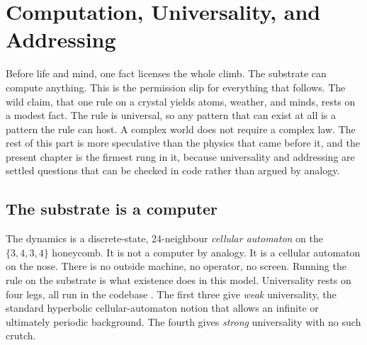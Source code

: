\section{Computation, Universality, and Addressing}

Before life and mind, one fact licenses the whole climb. The substrate can compute anything. This is the permission slip for everything that follows. The wild claim, that one rule on a crystal yields atoms, weather, and minds, rests on a modest fact. The rule is universal, so any pattern that can exist at all is a pattern the rule can host. A complex world does not require a complex law. The rest of this part is more speculative than the physics that came before it, and the present chapter is the firmest rung in it, because universality and addressing are settled questions that can be checked in code rather than argued by analogy.

\subsection{The substrate is a computer}

The dynamics is a discrete-state, 24-neighbour \emph{cellular automaton} on the $\{3,4,3,4\}$ honeycomb. It is not a computer by analogy. It is a cellular automaton on the nose. There is no outside machine, no operator, no screen. Running the rule on the substrate is what existence does in this model. Universality rests on four legs, all run in the codebase \cite{pollard2026vibetest}. The first three give \emph{weak} universality, the standard hyperbolic cellular-automaton notion that allows an infinite or ultimately periodic background. The fourth gives \emph{strong} universality with no such crutch.

